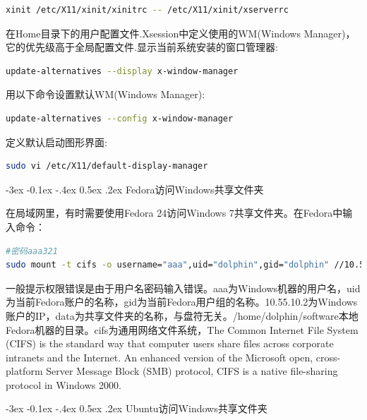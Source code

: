 \documentclass[12pt]{book}
\makeatletter
\numberwithin{dummy}{section}
\theoremstyle{ocrenumbox}
\theoremstyle{blacknumex}
\theoremstyle{blacknumbox}
\theoremstyle{ocrenum}
\renewcommand{\subsection}{\@startsection {subsection}{2}{\z@}
	{-3ex \@plus -0.1ex \@minus -.4ex}
	{0.5ex \@plus.2ex }
	{\normalfont\sffamily\bfseries}}
\makeatother
\begin{document}
\begin{lstlisting}[language=Bash]
xinit /etc/X11/xinit/xinitrc -- /etc/X11/xinit/xserverrc 
\end{lstlisting}

在Home目录下的用户配置文件.Xsession中定义使用的WM(Windows Manager)，它的优先级高于全局配置文件.显示当前系统安装的窗口管理器:

\begin{lstlisting}[language=Bash]
update-alternatives --display x-window-manager
\end{lstlisting}

用以下命令设置默认WM(Windows Manager):

\begin{lstlisting}[language=Bash]
update-alternatives --config x-window-manager
\end{lstlisting}

定义默认启动图形界面:

\begin{lstlisting}[language=Bash]
sudo vi /etc/X11/default-display-manager
\end{lstlisting}



\subsection{Fedora访问Windows共享文件夹}

在局域网里，有时需要使用Fedora 24访问Windows 7共享文件夹。在Fedora中输入命令：

\begin{lstlisting}[language=Bash]
#密码aaa321
sudo mount -t cifs -o username="aaa",uid="dolphin",gid="dolphin" //10.55.10.2/data /home/dolphin/software
\end{lstlisting}

一般提示权限错误是由于用户名密码输入错误。aaa为Windows机器的用户名，uid为当前Fedora账户的名称，gid为当前Fedora用户组的名称。10.55.10.2为Windows账户的IP，data为共享文件夹的名称，与盘符无关。/home/dolphin/software本地Fedora机器的目录。cifs为通用网络文件系统，The Common Internet File System (CIFS) is the standard way that computer users share files across corporate intranets and the Internet. An enhanced version of the Microsoft open, cross-platform Server Message Block (SMB) protocol, CIFS is a native file-sharing protocol in Windows 2000.

\subsection{Ubuntu访问Windows共享文件夹}
\end{document}
